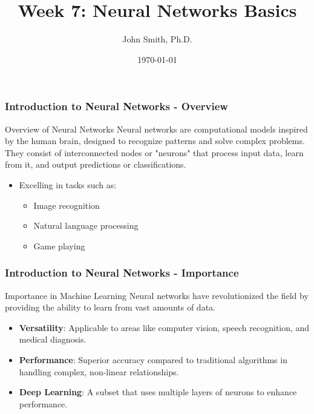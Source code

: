 \documentclass[aspectratio=169]{beamer}
\title[Week 7: Neural Networks Basics]{Week 7: Neural Networks Basics}
\author[J. Smith]{John Smith, Ph.D.}
\institute[University Name]{
  Department of Computer Science\\
  University Name\\
  \vspace{0.3cm}
  Email: email@university.edu\\
  Website: www.university.edu
}
\date{\today}
\begin{document}
\frame{\titlepage}

\begin{frame}[fragile]
    \titlepage
\end{frame}

\begin{frame}[fragile]
    \frametitle{Introduction to Neural Networks - Overview}
    \begin{block}{Overview of Neural Networks}
        Neural networks are computational models inspired by the human brain, designed to recognize patterns and solve complex problems. They consist of interconnected nodes or "neurons" that process input data, learn from it, and output predictions or classifications. 
    \end{block}
    \begin{itemize}
        \item Excelling in tasks such as:
        \begin{itemize}
            \item Image recognition
            \item Natural language processing
            \item Game playing
        \end{itemize}
    \end{itemize}
\end{frame}

\begin{frame}[fragile]
    \frametitle{Introduction to Neural Networks - Importance}
    \begin{block}{Importance in Machine Learning}
        Neural networks have revolutionized the field by providing the ability to learn from vast amounts of data. 
    \end{block}
    \begin{itemize}
        \item \textbf{Versatility}: Applicable to areas like computer vision, speech recognition, and medical diagnosis.
        \item \textbf{Performance}: Superior accuracy compared to traditional algorithms in handling complex, non-linear relationships.
        \item \textbf{Deep Learning}: A subset that uses multiple layers of neurons to enhance performance.
    \end{itemize}
\end{frame}
\end{document}
